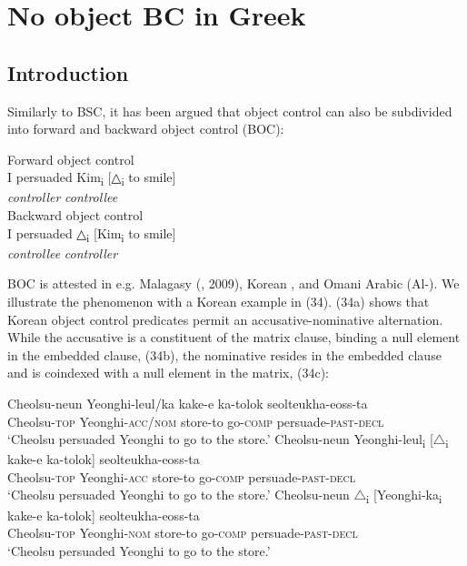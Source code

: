 \documentclass[output=paper]{langsci/langscibook}
\begin{document}
\section{No object BC in Greek} 

\subsection{Introduction}
Similarly to BSC, it has been argued that object control can also be subdivided into forward and backward object control (BOC):

\ea%
    \label{ex:alexiadou:33}
    \ea Forward object control\\
    \gll I persuaded   Kim\textsubscript{i}     [{△\textsubscript{i}} to smile]  \\
         {}   {}       \textit{controller}         \textit{controllee}\\
    \ex Backward object control\\
    \gll I persuaded  △\textsubscript{i}    [Kim\textsubscript{i}    to smile]  \\
        {}    {}       \textit{controllee}  \textit{controller}\\
        \z
\z

BOC is attested in e.g. Malagasy (\citealt{Potsdam2006}, 2009), Korean \citep{Monahan2003}, and Omani Arabic (Al-\citealt{Balushi2008}). We illustrate the phenomenon with a Korean example in (34). (34a) shows that Korean object control predicates permit an accusative-nominative alternation. While the accusative is a constituent of the matrix clause, binding a null element in the embedded clause, (34b), the nominative resides in the embedded clause and is coindexed with a null element in the matrix, (34c):
 
\ea%
    \label{ex:alexiadou:34}
    \ea\gll Cheolsu-neun  Yeonghi-leul/ka     kake-e    ka-tolok   seolteukha-eoss-ta\\
            Cheolsu-\textsc{top}     Yeonghi-\textsc{acc/nom}   store-to  go-\textsc{comp}   persuade-\textsc{past-decl}\\
    \glt    ‘Cheolsu persuaded Yeonghi to go to the store.’
    \ex
    \gll Cheolsu-neun Yeonghi-leul\textsubscript{i} [${\bigtriangleup}$\textsubscript{i} kake-e     ka-tolok]  seolteukha-eoss-ta\\
             Cheolsu-\textsc{top}    Yeonghi-\textsc{acc}          store-to   go-\textsc{comp}   persuade-\textsc{past-decl}\\
    \glt     ‘Cheolsu persuaded Yeonghi to go to the store.’     
    \ex
    \gll Cheolsu-neun ${\bigtriangleup}$\textsubscript{i} [Yeonghi-ka\textsubscript{i}    kake-e    ka-tolok]  seolteukha-eoss-ta\\
             Cheolsu-\textsc{top}         Yeonghi-\textsc{nom}    store-to  go-\textsc{comp}      persuade-\textsc{past-decl}\\
    \glt     ‘Cheolsu persuaded Yeonghi to go to the store.’ 
    \z
\z
\end{document}
